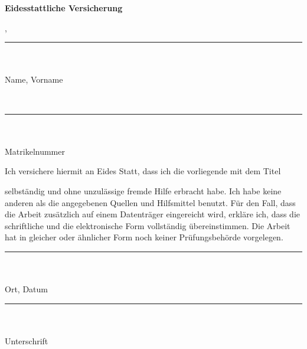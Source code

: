 
\newpage
\thispagestyle{empty}
\begin{center}
	\Large\textbf{Eidesstattliche Versicherung}
\end{center}
\vspace{5mm}

\begin{spacing}{0.4}
\noindent 
\begin{minipage}[t]{0.41\textwidth}
		\authorsurname,~\authorprename\\
		\noindent 
		\rule{\textwidth}{0.4pt} \\\\
		Name, Vorname
\end{minipage}
\hfill
\begin{minipage}[t]{0.41\textwidth}
	\matriculationnumber\\
	\noindent 
	\rule{\textwidth}{0.4pt}\\\\
	Matrikelnummer
\end{minipage}
\end{spacing}


\vspace{10mm}
\noindent
Ich versichere hiermit an Eides Statt, dass ich die vorliegende  mit dem Titel
\vspace{4mm}

\noindent
\textbf{\germantitle}


\vspace{4mm}
\noindent
selbständig und ohne unzulässige fremde Hilfe erbracht habe. Ich habe keine anderen als die angegebenen Quellen und Hilfsmittel benutzt. Für den Fall, dass die Arbeit zusätzlich auf einem Datenträger eingereicht wird, erkläre ich, dass die schriftliche und die elektronische Form vollständig übereinstimmen. Die Arbeit hat in gleicher oder ähnlicher Form noch keiner Prüfungsbehörde vorgelegen.\\
\vspace{4mm}
\vfil

\begin{spacing}{0.4}
\noindent 
\begin{minipage}[t]{0.41\textwidth}
	\rule{\textwidth}{0.4pt}\\\\
	Ort, Datum
\end{minipage}
\hfill
\begin{minipage}[t]{0.41\textwidth}
	\rule{\textwidth}{0.4pt}\\\\
	Unterschrift
\end{minipage}
\end{spacing}

